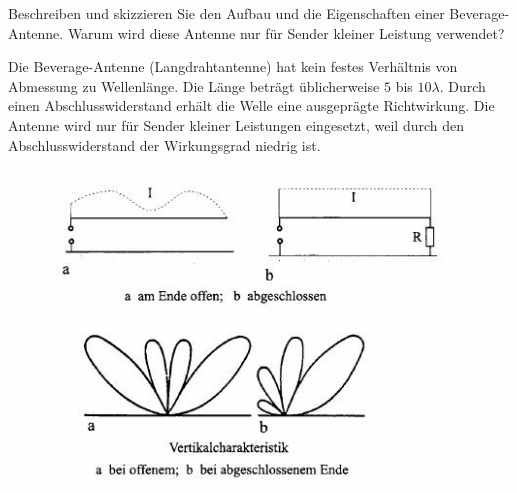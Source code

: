 \begin{question}[section=11,name={Beverage-Antenne},difficulty=,quantity=,type=thr,tags={20130625}]
	Beschreiben und skizzieren Sie den Aufbau und die Eigenschaften einer Beverage-Antenne. Warum wird diese Antenne nur für Sender kleiner Leistung verwendet?
	
	
\end{question}
\begin{solution}
	Die Beverage-Antenne (Langdrahtantenne) hat kein festes Verhältnis von Abmessung zu Wellenlänge. Die Länge beträgt üblicherweise $5$ bis $10\lambda$. Durch einen Abschlusswiderstand erhält die Welle eine ausgeprägte Richtwirkung. Die Antenne wird nur für Sender kleiner Leistungen eingesetzt, weil durch den Abschlusswiderstand der Wirkungsgrad niedrig ist.
	\begin{figure}[H]
		\includegraphics[width=14cm]{./opn/exm/thr/chp/11/1/bild.jpeg}
	\end{figure}
\end{solution}